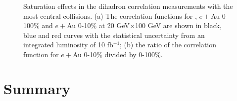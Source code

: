 \begin{figure}[hbt!]
\begin{center}
\quad
{}

\caption[Dihadron with centrality bin]{Saturation effects in the dihadron correlation measurements with the most central collisions. (a) The correlation functions for \ep, $e+$Au 0-100\% and $e+$Au 0-10\% at 20 GeV$\times$100 GeV are shown in black, blue and red curves with the statistical uncertainty from an integrated luminosity of 10 fb$^{-1}$; (b) the ratio of the correlation function for $e+$Au 0-10\% divided by 0-100\%.}
\label{fig:dihadron_centrality}
\end{center}
\end{figure}





\section{Summary} \label{sec:summary}

